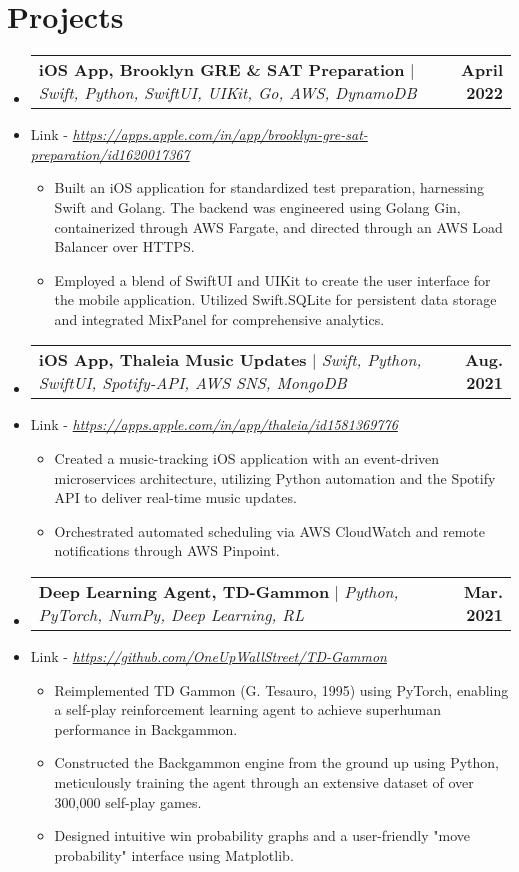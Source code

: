 \documentclass[letterpaper,11pt]{article}
\makeatletter
\newcommand{\resumeItem}[1]{
  \item\small{
    {#1 \vspace{-2pt}}
  }
}
\newcommand{\resumeProjectHeading}[2]{
    \item
    \begin{tabular*}{1.001\textwidth}{l@{\extracolsep{\fill}}r}
      \small#1 & \textbf{\small #2}\\
    \end{tabular*}\vspace{-7pt}
}
\newcommand{\resumeSubItem}[1]{\resumeItem{#1}\vspace{-4pt}}
\newcommand{\resumeSubHeadingListStart}{\begin{itemize}[leftmargin=0.0in, label={}]}
\newcommand{\resumeSubHeadingListEnd}{\end{itemize}}
\newcommand{\resumeItemListStart}{\begin{itemize}}
\newcommand{\resumeItemListEnd}{\end{itemize}\vspace{-5pt}}
\makeatother
\begin{document}
\section{Projects}
    \vspace{-5pt}
    \resumeSubHeadingListStart
      \resumeProjectHeading
          {\textbf{iOS App, Brooklyn GRE \& SAT Preparation} $|$ \emph{Swift, Python, SwiftUI, UIKit, Go, AWS, DynamoDB}}{April 2022}
          \resumeSubItem{Link - \href{https://apps.apple.com/in/app/brooklyn-gre-sat-preparation/id1620017367}{\textit{https://apps.apple.com/in/app/brooklyn-gre-sat-preparation/id1620017367}}}
          \resumeItemListStart
            \resumeItem{Built an iOS application for standardized test preparation, harnessing Swift and Golang. The backend was engineered using Golang Gin, containerized through AWS Fargate, and directed through an AWS Load Balancer over HTTPS.}
            \resumeItem{Employed a blend of SwiftUI and UIKit to create the user interface for the mobile application. Utilized Swift.SQLite for persistent data storage and integrated MixPanel for comprehensive analytics.}
          \resumeItemListEnd
          \vspace{-13pt}
      \resumeProjectHeading
          {\textbf{iOS App, Thaleia Music Updates} $|$ \emph{Swift, Python, SwiftUI, Spotify-API, AWS SNS, MongoDB}}{Aug. 2021}
        \resumeSubItem{Link - \href{https://apps.apple.com/in/app/thaleia/id1581369776}{\textit{https://apps.apple.com/in/app/thaleia/id1581369776}} }
          \resumeItemListStart
            \resumeItem{Created a music-tracking iOS application with an event-driven microservices architecture, utilizing Python automation and the Spotify API to deliver real-time music updates.}
            \resumeItem{Orchestrated automated scheduling via AWS CloudWatch and remote notifications through AWS Pinpoint.}
          \resumeItemListEnd 
          \vspace{-13pt}
          \resumeProjectHeading
          {\textbf{Deep Learning Agent, TD-Gammon} $|$ \emph{Python, PyTorch, NumPy, Deep Learning, RL}}{Mar. 2021}
          \resumeSubItem{Link - \href{https://github.com/OneUpWallStreet/TD-Gammon}{\textit{https://github.com/OneUpWallStreet/TD-Gammon}}}
          \resumeItemListStart
            \resumeItem{Reimplemented TD Gammon (G. Tesauro, 1995) using PyTorch, enabling a self-play reinforcement learning agent to achieve superhuman performance in Backgammon.}
            \resumeItem{Constructed the Backgammon engine from the ground up using Python, meticulously training the agent through an extensive dataset of over 300,000 self-play games.}
            \resumeItem{Designed intuitive win probability graphs and a user-friendly "move probability" interface using Matplotlib.}
          \resumeItemListEnd 
    \resumeSubHeadingListEnd
\vspace{-15pt}
\end{document}
